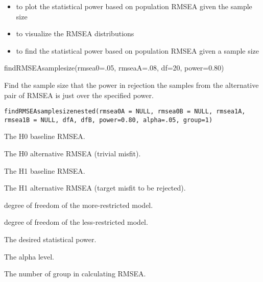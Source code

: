 \documentclass[a4paper]{book}
\begin{document}
%
\begin{SeeAlso}\relax
\begin{itemize}

\item {} to plot the statistical power based on population RMSEA given the sample size
\item {} to visualize the RMSEA distributions
\item {} to find the statistical power based on population RMSEA given a sample size

\end{itemize}

\end{SeeAlso}
%
\begin{Examples}
\begin{ExampleCode}
findRMSEAsamplesize(rmsea0=.05, rmseaA=.08, df=20, power=0.80)
\end{ExampleCode}
\end{Examples}
%
\begin{Description}\relax
Find the sample size that the power in rejection the samples from the alternative pair of RMSEA is just over the specified power.
\end{Description}
%
\begin{Usage}
\begin{verbatim}
findRMSEAsamplesizenested(rmsea0A = NULL, rmsea0B = NULL, rmsea1A, 
rmsea1B = NULL, dfA, dfB, power=0.80, alpha=.05, group=1)
\end{verbatim}
\end{Usage}
%
\begin{Arguments}
\begin{ldescription}
\item[\code{rmsea0A}] The H0 baseline RMSEA.
\item[\code{rmsea0B}] The H0 alternative RMSEA (trivial misfit).
\item[\code{rmsea1A}] The H1 baseline RMSEA.
\item[\code{rmsea1B}] The H1 alternative RMSEA (target misfit to be rejected).
\item[\code{dfA}] degree of freedom of the more-restricted model.
\item[\code{dfB}] degree of freedom of the less-restricted model.
\item[\code{power}] The desired statistical power.
\item[\code{alpha}] The alpha level.
\item[\code{group}] The number of group in calculating RMSEA.
\end{ldescription}
\end{Arguments}
\end{document}
